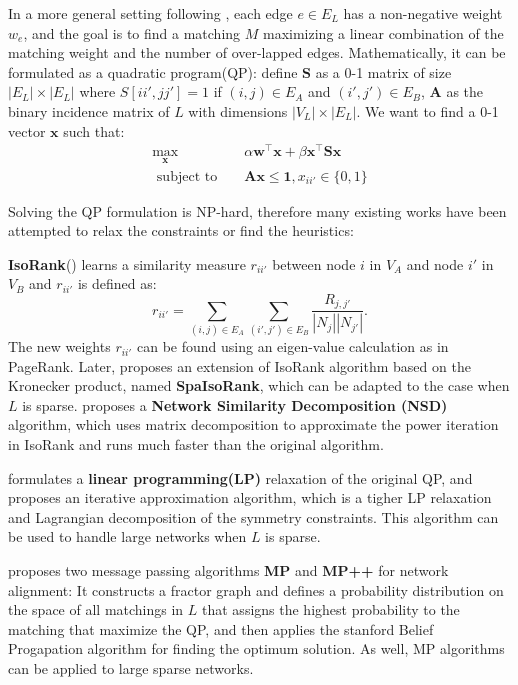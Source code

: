 \documentclass[11pt,letterpaper]{article}
\begin{document}
In a more general setting following \cite{Singh2007}, each edge $e \in E_L$ has a non-negative weight $w_e$, and the goal is to find a matching $M$ maximizing a linear combination of the matching weight and the number of over-lapped edges. Mathematically, it can be formulated as a quadratic program(QP): define $\mathbf{S}$ as a 0-1 matrix of size $|E_L| \times |E_L|$ where $S[ii',  jj'] = 1$ if $(i, j) \in E_A$ and $(i', j') \in E_B$, $\mathbf{A}$ as the binary incidence matrix of $L$ with dimensions $|V_L| \times |E_L|$. We want to find a 0-1 vector $\mathbf{x}$ such that:
\begin{eqnarray*}
		\max_{\mathbf{x}} & & {\alpha \mathbf{w}^{\intercal}\mathbf{x} + \beta \mathbf{x}^{\intercal}\mathbf{S}\mathbf{x}} \\
		\text{ subject to  } & &  \mathbf{A}\mathbf{x} \leq \mathbf{1}, x_{ii'} \in \{0, 1\}
\end{eqnarray*}

Solving the QP formulation is NP-hard, therefore many existing works have been attempted to relax the constraints or find the heuristics:

\textbf{IsoRank}(\cite{Singh2008}) learns a similarity measure $r_{ii'}$ between node $i$ in $V_A$ and node $i'$ in $V_B$ and $r_{ii'}$ is defined as:
	\begin{equation*}
           r_{ii'} = \sum_{(i, j) \in E_A}{\sum_{(i', j') \in E_B}{\frac{R_{j, j'}}{|N_j||N_{j'}|}}}.
	\end{equation*}
The new weights $r_{ii'}$ can be found using an eigen-value calculation as in PageRank. Later, \cite{Bayati2009a} proposes an extension of IsoRank algorithm based on the Kronecker product, named \textbf{SpaIsoRank}, which can be adapted to the case when $L$ is sparse. \cite{Kollias2011} proposes a \textbf{Network Similarity Decomposition (NSD)} algorithm, which uses matrix decomposition to approximate the power iteration in IsoRank and runs much faster than the original algorithm.

\cite{Klau2009} formulates a \textbf{linear programming(LP)} relaxation of the original QP, and proposes an iterative approximation algorithm, which is a tigher LP relaxation and Lagrangian decomposition of the symmetry constraints. This algorithm can be used to handle large networks when $L$ is sparse.

\cite{Bayati2009a} proposes two message passing algorithms \textbf{MP} and \textbf{MP++} for network alignment: It constructs a fractor graph and defines a probability distribution on the space of all matchings in $L$ that assigns the highest probability to the matching that maximize the QP, and then applies the stanford Belief Progapation algorithm for finding the optimum solution. As well, MP algorithms can be applied to large sparse networks.
\end{document}
